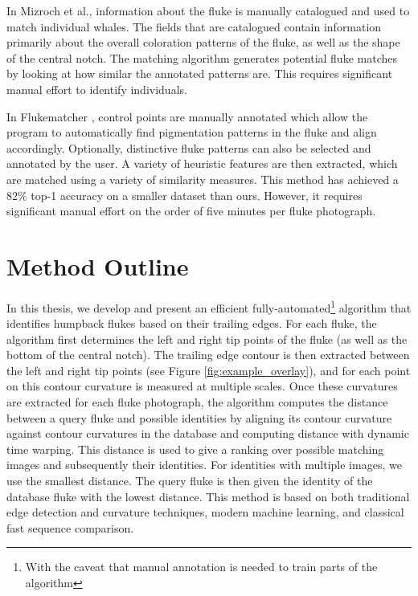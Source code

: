 In Mizroch et al., information about the fluke is manually catalogued and used to match individual whales. 
The fields that are catalogued contain information primarily about the overall coloration patterns of the fluke, as well as the shape of the central notch. 
The matching algorithm generates potential fluke matches by looking at how similar the annotated patterns are.
This requires significant manual effort to identify individuals.

In Flukematcher \cite{kniest2010fluke}, control points are manually annotated which allow the program to automatically find pigmentation patterns in the fluke and align accordingly.
Optionally, distinctive fluke patterns can also be selected and annotated by the user.
A variety of heuristic features are then extracted, which are matched using a variety of similarity measures.
This method has achieved a 82\% top-1 accuracy on a smaller dataset than ours.
However, it requires significant manual effort on the order of five minutes per fluke photograph.

\section{Method Outline}


In this thesis, we develop and present an efficient fully-automated\footnote{With the caveat that manual annotation is needed to train parts of the algorithm} algorithm that identifies humpback flukes based on their trailing edges.
For each fluke, the algorithm first determines the left and right tip points of the fluke (as well as the bottom of the central notch). 
The trailing edge contour is then extracted between the left and right tip points (see Figure \ref{fig:example_overlay}), and for each point on this contour curvature is measured at multiple scales.
Once these curvatures are extracted for each fluke photograph, the algorithm computes the distance between a query fluke and possible identities by aligning its contour curvature against contour curvatures in the database and computing distance with dynamic time warping.
This distance is used to give a ranking over possible matching images and subsequently their identities.  
For identities with multiple images, we use the smallest distance.
The query fluke is then given the identity of the database fluke with the lowest distance.
This method is based on both traditional edge detection and curvature techniques, modern machine learning, and classical fast sequence comparison.

